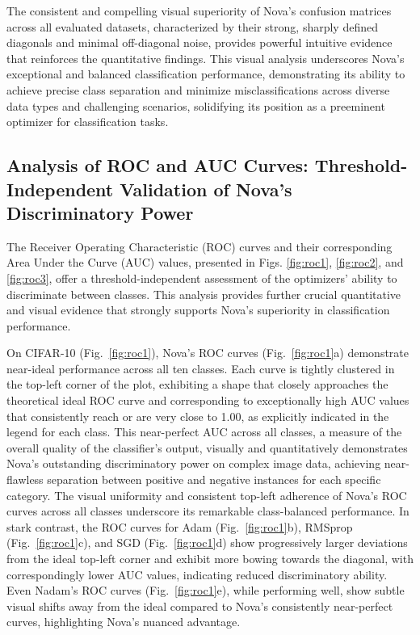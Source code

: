 \documentclass{article}
\begin{document}
The consistent and compelling visual superiority of Nova's confusion matrices across all evaluated datasets, characterized by their strong, sharply defined diagonals and minimal off-diagonal noise, provides powerful intuitive evidence that reinforces the quantitative findings. This visual analysis underscores Nova's exceptional and balanced classification performance, demonstrating its ability to achieve precise class separation and minimize misclassifications across diverse data types and challenging scenarios, solidifying its position as a preeminent optimizer for classification tasks.

\subsection{Analysis of ROC and AUC Curves: Threshold-Independent Validation of Nova's Discriminatory Power}

The Receiver Operating Characteristic (ROC) curves and their corresponding Area Under the Curve (AUC) values, presented in Figs. \ref{fig:roc1}, \ref{fig:roc2}, and \ref{fig:roc3}, offer a threshold-independent assessment of the optimizers' ability to discriminate between classes. This analysis provides further crucial quantitative and visual evidence that strongly supports Nova's superiority in classification performance.

On CIFAR-10 (Fig.~\ref{fig:roc1}), Nova's ROC curves (Fig.~\ref{fig:roc1}a) demonstrate near-ideal performance across all ten classes. Each curve is tightly clustered in the top-left corner of the plot, exhibiting a shape that closely approaches the theoretical ideal ROC curve and corresponding to exceptionally high AUC values that consistently reach or are very close to 1.00, as explicitly indicated in the legend for each class. This near-perfect AUC across all classes, a measure of the overall quality of the classifier's output, visually and quantitatively demonstrates Nova's outstanding discriminatory power on complex image data, achieving near-flawless separation between positive and negative instances for each specific category. The visual uniformity and consistent top-left adherence of Nova's ROC curves across all classes underscore its remarkable class-balanced performance. In stark contrast, the ROC curves for Adam (Fig.~\ref{fig:roc1}b), RMSprop (Fig.~\ref{fig:roc1}c), and SGD (Fig.~\ref{fig:roc1}d) show progressively larger deviations from the ideal top-left corner and exhibit more bowing towards the diagonal, with correspondingly lower AUC values, indicating reduced discriminatory ability. Even Nadam's ROC curves (Fig.~\ref{fig:roc1}e), while performing well, show subtle visual shifts away from the ideal compared to Nova's consistently near-perfect curves, highlighting Nova's nuanced advantage.
\end{document}
